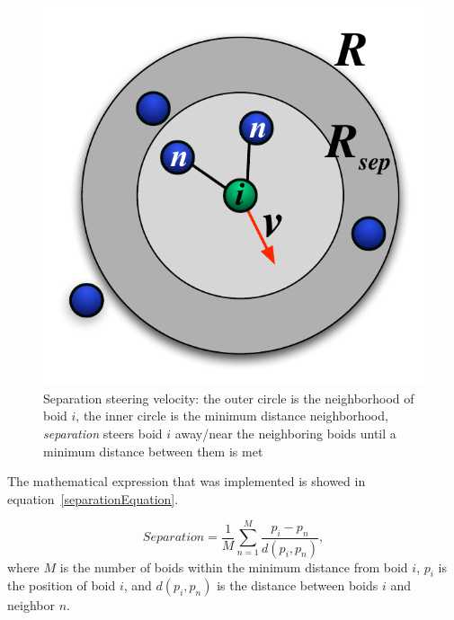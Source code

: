 \begin{figure}[htbp]
\begin{center}
\includegraphics[scale=0.85]{figures/separation.pdf}
\caption{Separation steering velocity: the outer circle is the neighborhood of boid $i$, the inner circle is the minimum distance neighborhood, \textit{separation} steers boid $i$ away/near the neighboring boids until a minimum distance between them is met}
\label{separationPDF}
\end{center}
\end{figure}

The mathematical expression that was implemented is showed in equation~\ref{separationEquation}.

\begin{equation}
\label{separationEquation}
Separation =\frac{1}{M} \sum_{n=1}^{M} \frac{p_i - p_n}{d(p_i,p_n)},
\end{equation}
where $M$ is the number of boids within the minimum distance from boid $i$, $p_i$ is the position of boid $i$, and $d(p_i,p_n)$ is the distance between boids $i$ and neighbor $n$.


